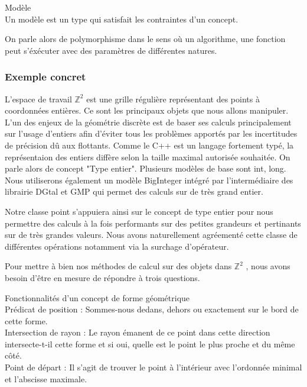 \begin{Definition}{Modèle}\\
  Un modèle est un type qui satisfait les contraintes d'un concept.
\label{def:cpp-mod}

\end{Definition}

On parle alors de polymorphisme dans le sens où un algorithme, une fonction peut s'éxécuter avec des paramètres de différentes natures.

\subsubsection{Exemple concret}

L'espace de travail $\mathbb{Z}^{2}$ est une grille régulière représentant des points à coordonnées entières. Ce sont les principaux objets que nous allons manipuler. L'un des enjeux de la géométrie discrète est de baser ses calculs principalement sur l'usage d'entiers afin d'éviter tous les problèmes apportés par les incertitudes de précision dû aux flottants. Comme le C++ est un langage fortement typé, la représentaion des entiers diffère selon la taille maximal autorisée souhaitée. On parle alors de concept "Type entier". Plusieurs modèles de base sont int, long. Nous utiliserons également un modèle BigInteger intégré par l'intermédiaire des librairie DGtal et GMP qui permet des calculs sur de très grand entier.


Notre classe point s’appuiera ainsi sur le concept de type entier pour nous permettre des calculs à la fois performants sur des petites grandeurs et pertinants sur de très grandes valeurs. Nous avons naturellement agréementé cette classe de différentes opérations notamment via la surchage d'opérateur.


Pour mettre à bien nos méthodes de calcul sur des objets dans $\mathbb{Z}^{2}$ , nous avons besoin d'être en mesure de répondre à trois questions.

\begin{Definition}{ Fonctionnalités d'un concept de forme géométrique}\\
\label{def:cpp-fonc}
   Prédicat de position : Sommes-nous dedans, dehors ou exactement sur le bord de cette forme.\\
   Intersection de rayon : Le rayon émanent de ce point dans cette direction intersecte-t-il cette forme et si oui, quelle est le point le plus proche et du même côté.\\
   Point de départ : Il s'agit de trouver le point à l'intérieur avec l'ordonnée minimal et l'abscisse maximale. 
\end{Definition}

